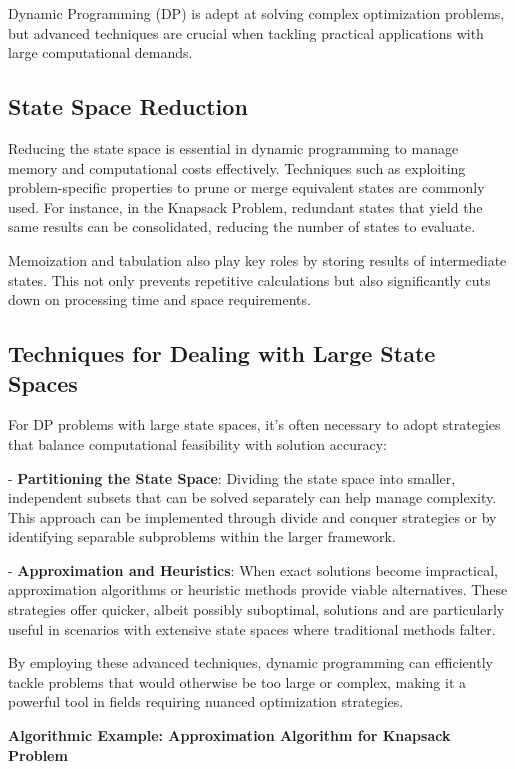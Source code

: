 \documentclass[12pt]{book} %
\begin{document}
Dynamic Programming (DP) is adept at solving complex optimization problems, but advanced techniques are crucial when tackling practical applications with large computational demands.

\subsection{State Space Reduction}

Reducing the state space is essential in dynamic programming to manage memory and computational costs effectively. Techniques such as exploiting problem-specific properties to prune or merge equivalent states are commonly used. For instance, in the Knapsack Problem, redundant states that yield the same results can be consolidated, reducing the number of states to evaluate.

Memoization and tabulation also play key roles by storing results of intermediate states. This not only prevents repetitive calculations but also significantly cuts down on processing time and space requirements.

\subsection{Techniques for Dealing with Large State Spaces}

For DP problems with large state spaces, it's often necessary to adopt strategies that balance computational feasibility with solution accuracy:

- \textbf{Partitioning the State Space}: Dividing the state space into smaller, independent subsets that can be solved separately can help manage complexity. This approach can be implemented through divide and conquer strategies or by identifying separable subproblems within the larger framework.

- \textbf{Approximation and Heuristics}: When exact solutions become impractical, approximation algorithms or heuristic methods provide viable alternatives. These strategies offer quicker, albeit possibly suboptimal, solutions and are particularly useful in scenarios with extensive state spaces where traditional methods falter.

By employing these advanced techniques, dynamic programming can efficiently tackle problems that would otherwise be too large or complex, making it a powerful tool in fields requiring nuanced optimization strategies.


\textbf{Algorithmic Example: Approximation Algorithm for Knapsack Problem}
\end{document}
